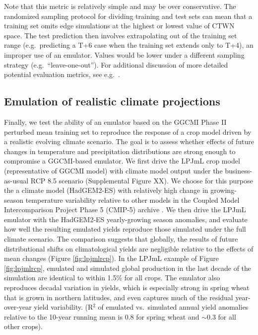 \documentclass[gmd, manuscript]{copernicus} %
\begin{document}
Note that this metric is relatively simple and may be over conservative.
The randomized sampling protocol for dividing training and test sets can mean that a training set omits edge simulations at the highest or lowest value of CTWN space. 
The test prediction then involves extrapolating out of the training set range (e.g.\ predicting a T+6 case when the training set extends only to T+4), an improper use of an emulator. 
Values would be lower under a different sampling strategy (e.g.\ ``leave-one-out''). 
For additional discussion of more detailed potential evaluation metrics, see e.g.\ \citet{Castruccio14}.

\smallskip
\label{S:4.3}
\subsection{Emulation of realistic climate projections}
Finally, we test the ability of an emulator based on the GGCMI Phase II perturbed mean training set to reproduce the response of a crop model driven by a realistic evolving climate scenario. The goal is to assess whether effects of future changes in temperature and precipitation distributions  are strong enough to compromise a GGCMI-based emulator.
We first drive the LPJmL crop model (representative of GGCMI  model) with climate model output under the business-as-usual RCP 8.5 scenario (Supplemental Figure XX).
We choose for this purpose the a  climate model (HadGEM2-ES) with relatively high change in growing-season temperature variability relative to other models in the Coupled Model Intercomparison Project Phase 5 (CMIP-5) archive \citep{Jones2011h, Martin2011}. 
We then drive the LPJmL emulator with the HadGEM2-ES yearly-growing season anomalies, and evaluate how well the resulting emulated yields reproduce those simulated under the full climate scenario. 
The comparison suggests that globally, the results of future distributional shifts on climatological yields are negligible relative to the effects of mean changes (Figure \ref{fig:lpjmlrcp}). 
In the LPJmL example of Figure \ref{fig:lpjmlrcp}, emulated and simulated global production in the last decade of the simulation are identical to within 1.5\% for all crops. 
The emulator also reproduces decadal variation in yields, which is especially strong in spring wheat that is grown in northern latitudes, and even captures much of the residual year-over-year yield variability. (R$^2$ of emulated vs.\ simulated annual yield anomalies relative to the 10-year running mean is 0.8 for spring wheat and $\sim$0.3 for all other crops).
\end{document}
